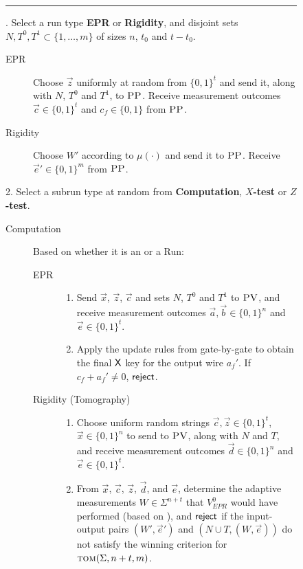 \documentclass{toc}
\newcommand{\tom}{\textsc{tom}}
\newcommand{\pv}{\textsc{PV}}
\newcommand{\pp}{\textsc{PP}}
\begin{document}
\begin{figure}[H]
\rule[1ex]{\textwidth}{0.5pt}
\vspace{-20pt}
. Select a run type \textbf{EPR} or \textbf{Rigidity}, and disjoint sets $N,T^0,T^1\subset \{1,\ldots,m\}$ of sizes $n$, $t_0$ and $t-t_0$.  
\begin{description}
\item[EPR] Choose $\vec{z}$ uniformly at random from $\{0,1\}^t$ and send it, along with $N$, $T^0$ and $T^1$, to $\pp$. Receive measurement outcomes $\vec{c}\in\{0,1\}^t$ and $c_f\in\{0,1\}$ from $\pp$.
\vspace{-0.15cm}  %
\item[Rigidity] Choose $W'$ according to $\mu(\cdot)$ and send it to $\pp$. Receive $\vec{e}'\in \{0,1\}^m$ from $\pp$. 
\end{description}
2. Select a subrun type at random from \textbf{Computation}, \textbf{$X$-test} or \textbf{$Z$-test}. 
\begin{description}
\item[Computation] Based on whether it is
an  or a  Run:
\vspace{-0.07cm}   %
	\begin{description}
	\item[EPR]
		\begin{enumerate}
		\item[(i)] Send $\vec{x}$, $\vec{z}$, $\vec{c}$ and sets $N$, $T^0$ and $T^1$ to $\pv$, and receive measurement outcomes $\vec{a},\vec{b}\in \{0,1\}^n$ and $\vec{e}\in\{0,1\}^t$.
		\item[(ii)] Apply the update rules from  gate-by-gate to obtain the final $\sf X$ key for the output wire $a_f'$. If $c_f+a_f'\neq 0$, $\sf reject$. 
		\end{enumerate}
\vspace{-0.15cm}  %
	\item[Rigidity (Tomography)]
		\begin{enumerate}
		\item[(i)] Choose uniform random strings $\vec{c},\vec{z}\in\{0,1\}^t$, $\vec{x} \in \{0,1\}^n$ 
		to send to $\pv$, along with $N$ and $T$, and receive measurement outcomes $\vec{d}\in \{0,1\}^n$ and $\vec{e}\in\{0,1\}^t$. 
		\item[(ii)]
		From $\vec{x}$, $\vec{c}$, $\vec{z}$, $\vec{d}$, and $\vec{e}$, determine the adaptive measurements $W\in\Sigma^{n+t}$ that $V_{EPR}^0$ would have performed (based on ), and $\sf reject$ if the input-output pairs $(W',\vec{e}')$ and $(N\cup T,(W,\vec{e}))$ do not satisfy the winning criterion for $\tom(\Sigma,n+t,m)$.

\end{enumerate}
\end{description}
\end{description}
\end{figure}
\end{document}
